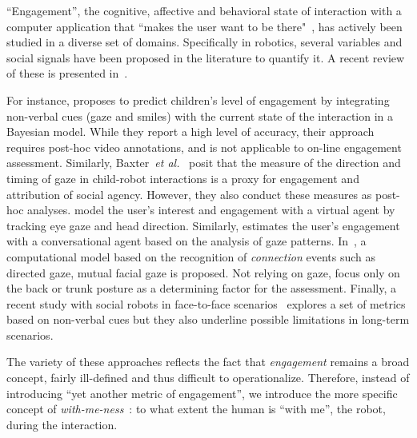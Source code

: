 \documentclass{sig-alternate}
\newcommand{\etal}{\textit{et al.}\xspace}
\begin{document}
``Engagement'', the cognitive, affective and behavioral state of interaction
with a computer application that ``makes the user want to be
there"~\cite{OBrien:2010}, has actively been studied in a diverse set of
domains. Specifically in robotics, several variables and social signals have
been proposed in the literature to quantify it. A recent review of these is
presented in~\cite{ivaldi2015towards}.


For instance, \cite{Castellano:2009} proposes to predict children's level of
engagement by integrating non-verbal cues (gaze and smiles) with the current
state of the interaction in a Bayesian model. While they report a high level of
accuracy, their approach requires post-hoc video annotations, and is not
applicable to on-line engagement assessment. Similarly,
Baxter~\etal~\cite{baxter2014tracking} posit that the measure of the direction
and timing of gaze in child-robot interactions is a proxy for engagement and
attribution of social agency. However, they also conduct these measures as
post-hoc analyses.  \cite{peters2010investigating} model the user's interest and
engagement with a virtual agent by tracking eye gaze and head direction.
Similarly, \cite{ishii2011combining} estimates the user's engagement with a
conversational agent based on the analysis of gaze patterns.
In~\cite{Rich:2010}, a computational model based on the recognition of
\emph{connection} events such as directed gaze, mutual facial gaze is proposed.
Not relying on gaze, \cite{Sanghvi:2011} focus only on the back or trunk posture
as a determining factor for the assessment. Finally, a recent study with social
robots in face-to-face scenarios~\cite{anzalone} explores a set of metrics based
on non-verbal cues but they also underline possible limitations in long-term
scenarios.

The variety of these approaches reflects the fact that \emph{engagement} remains
a broad concept, fairly ill-defined and thus difficult to operationalize.
Therefore, instead of introducing ``yet another metric of engagement'', we
introduce the more specific concept of \emph{with-me-ness}~\cite{sharma2014me}:
to what extent the human is ``with me'', the robot, during the interaction.
\end{document}
